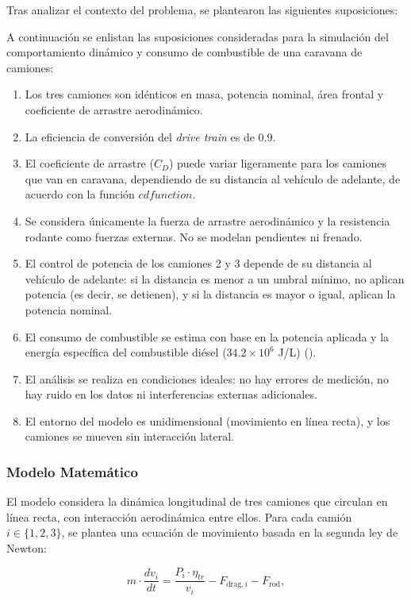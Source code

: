 \documentclass[11pt,stdletter,orderfromtodate,sigleft,twoside]{report}
\begin{document}
Tras analizar el contexto del problema, se plantearon las siguientes suposiciones:

A continuación se enlistan las suposiciones consideradas para la simulación del comportamiento dinámico y consumo de combustible de una caravana de camiones:

\begin{enumerate}
    \item Los tres camiones son idénticos en masa, potencia nominal, área frontal y coeficiente de arrastre aerodinámico.
    \item La eficiencia de conversión del \textit{drive train} es de 0.9.
    \item El coeficiente de arrastre ($C_D$) puede variar ligeramente para los camiones que van en caravana, dependiendo de su distancia al vehículo de adelante, de acuerdo con la función $cdfunction$.
    \item Se considera únicamente la fuerza de arrastre aerodinámico y la resistencia rodante como fuerzas externas. No se modelan pendientes ni frenado.
    \item El control de potencia de los camiones 2 y 3 depende de su distancia al vehículo de adelante: si la distancia es menor a un umbral mínimo, no aplican potencia (es decir, se detienen), y si la distancia es mayor o igual, aplican la potencia nominal.
    \item El consumo de combustible se estima con base en la potencia aplicada y la energía específica del combustible diésel ($34.2 \times 10^6$ J/L) (\cite{combustionEngine}).
    \item El análisis se realiza en condiciones ideales: no hay errores de medición, no hay ruido en los datos ni interferencias externas adicionales.
    \item El entorno del modelo es unidimensional (movimiento en línea recta), y los camiones se mueven sin interacción lateral.
\end{enumerate}

\subsubsection{Modelo Matemático}

El modelo considera la dinámica longitudinal de tres camiones que circulan en línea recta, con interacción aerodinámica entre ellos. Para cada camión $i \in \{1,2,3\}$, se plantea una ecuación de movimiento basada en la segunda ley de Newton:

\begin{equation}
    m \cdot \frac{dv_i}{dt} = \frac{P_i \cdot \eta_{tr}}{v_i} - F_{\text{drag},i} - F_{\text{rod}},
\end{equation}
\end{document}
